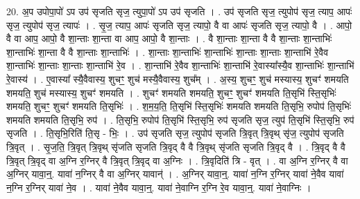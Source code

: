 \documentclass[17pt]{extarticle}
\begin{document}
20. अ॒प उपोपा॒पो॑ ऽप उप॑ सृजति सृज॒ त्युपा॒पो॑ ऽप उप॑ सृजति । . उप॑ सृजति सृज॒ त्युपोप॑ सृज॒ त्याप॒ आपः॑ सृज॒ त्युपोप॑ सृज॒ त्यापः॑ । . सृ॒ज॒ त्याप॒ आपः॑ सृजति सृज॒ त्यापो॒ वै वा आपः॑ सृजति सृज॒ त्यापो॒ वै । . आपो॒ वै वा आप॒ आपो॒ वै शा॒न्ताः शा॒न्ता वा आप॒ आपो॒ वै शा॒न्ताः । . वै शा॒न्ताः शा॒न्ता वै वै शा॒न्ताः शा॒न्ताभिः॑ शा॒न्ताभिः॑ शा॒न्ता वै वै शा॒न्ताः शा॒न्ताभिः॑ । . शा॒न्ताः शा॒न्ताभिः॑ शा॒न्ताभिः॑ शा॒न्ताः शा॒न्ताः शा॒न्ताभि॑ रे॒वैव शा॒न्ताभिः॑ शा॒न्ताः शा॒न्ताः शा॒न्ताभि॑ रे॒व । . शा॒न्ताभि॑ रे॒वैव शा॒न्ताभिः॑ शा॒न्ताभि॑ रे॒वास्या᳚स्यै॒व शा॒न्ताभिः॑ शा॒न्ताभि॑ रे॒वास्य॑ । . ए॒वास्या᳚ स्यै॒वैवास्य॒ शुचꣳ॒॒ शुच॑ मस्यै॒वैवास्य॒ शुच᳚म् । . अ॒स्य॒ शुचꣳ॒॒ शुच॑ मस्यास्य॒ शुचꣳ॑ शमयति शमयति॒ शुच॑ मस्यास्य॒ शुचꣳ॑ शमयति । . शुचꣳ॑ शमयति शमयति॒ शुचꣳ॒॒ शुचꣳ॑ शमयति ति॒सृभि॑ स्ति॒सृभिः॑ शमयति॒ शुचꣳ॒॒ शुचꣳ॑ शमयति ति॒सृभिः॑ । . श॒म॒य॒ति॒ ति॒सृभि॑ स्ति॒सृभिः॑ शमयति शमयति ति॒सृभि॒ रुपोप॑ ति॒सृभिः॑ शमयति शमयति ति॒सृभि॒ रुप॑ । . ति॒सृभि॒ रुपोप॑ ति॒सृभि॑ स्ति॒सृभि॒ रुप॑ सृजति सृज॒ त्युप॑ ति॒सृभि॑ स्ति॒सृभि॒ रुप॑ सृजति । . ति॒सृभि॒रिति॑ ति॒सृ - भिः॒ । . उप॑ सृजति सृज॒ त्युपोप॑ सृजति त्रि॒वृत् त्रि॒वृथ् सृ॑ज॒ त्युपोप॑ सृजति त्रि॒वृत् । . सृ॒ज॒ति॒ त्रि॒वृत् त्रि॒वृथ् सृ॑जति सृजति त्रि॒वृद् वै वै त्रि॒वृथ् सृ॑जति सृजति त्रि॒वृद् वै । . त्रि॒वृद् वै वै त्रि॒वृत् त्रि॒वृद् वा अ॒ग्नि र॒ग्निर् वै त्रि॒वृत् त्रि॒वृद् वा अ॒ग्निः । . त्रि॒वृदिति॑ त्रि - वृत् । . वा अ॒ग्नि र॒ग्निर् वै वा अ॒ग्निर् यावा॒न्॒. यावा॑ न॒ग्निर् वै वा अ॒ग्निर् यावान्॑ । . अ॒ग्निर् यावा॒न्॒. यावा॑ न॒ग्नि र॒ग्निर् यावा॑ ने॒वैव यावा॑ न॒ग्नि र॒ग्निर् यावा॑ ने॒व । . यावा॑ ने॒वैव यावा॒न्॒. यावा॑ ने॒वाग्नि र॒ग्नि रे॒व यावा॒न्॒. यावा॑ ने॒वाग्निः । \newline
\end{document}
